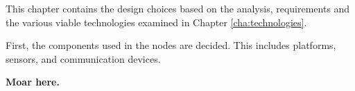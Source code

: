 \label{cha:designintro}

This chapter contains the design choices based on the analysis, requirements and the various viable technologies examined in Chapter \ref{cha:technologies}.

First, the components used in the nodes are decided. This includes platforms, sensors, and communication devices.

\textbf{Moar here.}\\




